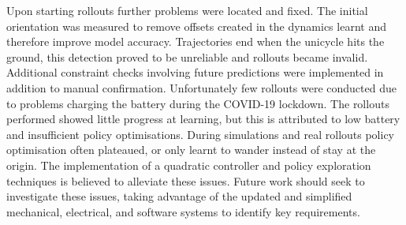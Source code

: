 \documentclass[twoside,twocolumn,12pt]{article}
\begin{document}
\newline
\newline
Upon starting rollouts further problems were located and fixed. The initial orientation was measured to remove offsets created in the dynamics learnt and therefore improve model accuracy. Trajectories end when the unicycle hits the ground, this detection proved to be unreliable and rollouts became invalid. Additional constraint checks involving future predictions were implemented in addition to manual confirmation.
\newline
\newline
Unfortunately few rollouts were conducted due to problems charging the battery during the COVID-19 lockdown. The rollouts performed showed little progress at learning, but this is attributed to low battery and insufficient policy optimisations.
\newline
\newline
During simulations and real rollouts policy optimisation often plateaued, or only learnt to wander instead of stay at the origin. The implementation of a quadratic controller and policy exploration techniques is believed to alleviate these issues.
\newline
\newline
Future work should seek to investigate these issues, taking advantage of the updated and simplified mechanical, electrical, and software systems to identify key requirements. 

\onecolumn

\tableofcontents

\twocolumn
\end{document}
